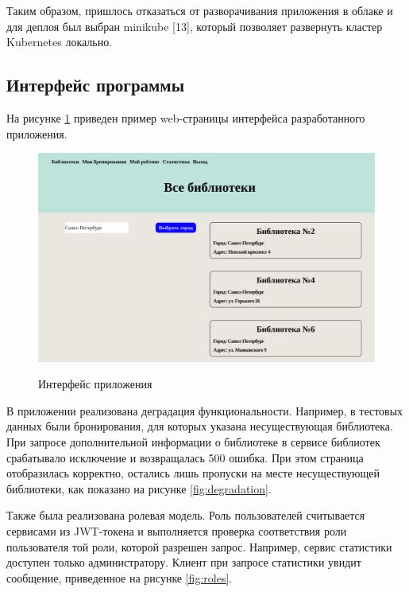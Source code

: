 \documentclass[a4paper, 12pt]{article}
\begin{document}
\begin{large}
Таким образом, пришлось отказаться от разворачивания приложения в облаке и для деплоя был выбран minikube [13], который позволяет развернуть кластер Kubernetes локально.

\subsection{Интерфейс программы}
На рисунке \ref{fig:interface} приведен пример web-страницы интерфейса разработанного приложения.
\begin{figure}[h!]
	\begin{center}
		{\includegraphics[scale = 0.2]{interface}}
		\caption{Интерфейс приложения}
		\label{fig:interface}
	\end{center}
\end{figure}

В приложении реализована деградация функциональности.
Например, в тестовых данных были бронирования, для которых указана несуществующая библиотека. 
При запросе дополнительной информации о библиотеке в сервисе библиотек срабатывало исключение и возвращалась 500 ошибка.
При этом страница отобразилась корректно, остались лишь пропуски на месте несуществующей библиотеки, как показано на рисунке \ref{fig:degradation}. 


Также была реализована ролевая модель.
Роль пользователей считывается сервисами из JWT-токена и выполняется проверка соответствия роли пользователя той роли, которой разрешен запрос.
Например, сервис статистики доступен только администратору.
Клиент при запросе статистики увидит сообщение, приведенное на рисунке \ref{fig:roles}. 


\end{large}
\end{document}
